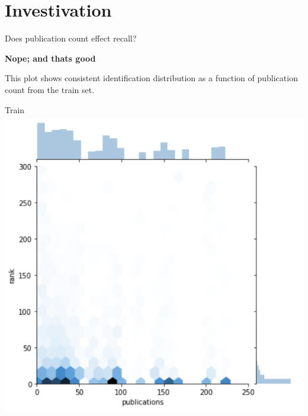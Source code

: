 \documentclass[10pt]{beamer}
\begin{document}
\section{Investivation}

\begin{frame}{Does publication count effect recall?}

  {\bf Nope; and thats good}


  This plot shows consistent identification distribution as a function of publication count from the train set.

  \begin{multicols}{2}
    Train
    \includegraphics[width=\columnwidth]{./Train.png}


\end{multicols}
\end{frame}
\end{document}
